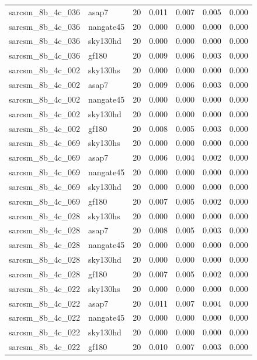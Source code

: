 \begin{tabular}{llrrrrr}
sarcsm\_8b\_4c\_036 & asap7 & 20 & 0.011 & 0.007 & 0.005 & 0.000 \\
sarcsm\_8b\_4c\_036 & nangate45 & 20 & 0.000 & 0.000 & 0.000 & 0.000 \\
sarcsm\_8b\_4c\_036 & sky130hd & 20 & 0.000 & 0.000 & 0.000 & 0.000 \\
sarcsm\_8b\_4c\_036 & gf180 & 20 & 0.009 & 0.006 & 0.003 & 0.000 \\
sarcsm\_8b\_4c\_002 & sky130hs & 20 & 0.000 & 0.000 & 0.000 & 0.000 \\
sarcsm\_8b\_4c\_002 & asap7 & 20 & 0.009 & 0.006 & 0.003 & 0.000 \\
sarcsm\_8b\_4c\_002 & nangate45 & 20 & 0.000 & 0.000 & 0.000 & 0.000 \\
sarcsm\_8b\_4c\_002 & sky130hd & 20 & 0.000 & 0.000 & 0.000 & 0.000 \\
sarcsm\_8b\_4c\_002 & gf180 & 20 & 0.008 & 0.005 & 0.003 & 0.000 \\
sarcsm\_8b\_4c\_069 & sky130hs & 20 & 0.000 & 0.000 & 0.000 & 0.000 \\
sarcsm\_8b\_4c\_069 & asap7 & 20 & 0.006 & 0.004 & 0.002 & 0.000 \\
sarcsm\_8b\_4c\_069 & nangate45 & 20 & 0.000 & 0.000 & 0.000 & 0.000 \\
sarcsm\_8b\_4c\_069 & sky130hd & 20 & 0.000 & 0.000 & 0.000 & 0.000 \\
sarcsm\_8b\_4c\_069 & gf180 & 20 & 0.007 & 0.005 & 0.002 & 0.000 \\
sarcsm\_8b\_4c\_028 & sky130hs & 20 & 0.000 & 0.000 & 0.000 & 0.000 \\
sarcsm\_8b\_4c\_028 & asap7 & 20 & 0.008 & 0.005 & 0.003 & 0.000 \\
sarcsm\_8b\_4c\_028 & nangate45 & 20 & 0.000 & 0.000 & 0.000 & 0.000 \\
sarcsm\_8b\_4c\_028 & sky130hd & 20 & 0.000 & 0.000 & 0.000 & 0.000 \\
sarcsm\_8b\_4c\_028 & gf180 & 20 & 0.007 & 0.005 & 0.002 & 0.000 \\
sarcsm\_8b\_4c\_022 & sky130hs & 20 & 0.000 & 0.000 & 0.000 & 0.000 \\
sarcsm\_8b\_4c\_022 & asap7 & 20 & 0.011 & 0.007 & 0.004 & 0.000 \\
sarcsm\_8b\_4c\_022 & nangate45 & 20 & 0.000 & 0.000 & 0.000 & 0.000 \\
sarcsm\_8b\_4c\_022 & sky130hd & 20 & 0.000 & 0.000 & 0.000 & 0.000 \\
sarcsm\_8b\_4c\_022 & gf180 & 20 & 0.010 & 0.007 & 0.003 & 0.000 \\

\end{tabular}
